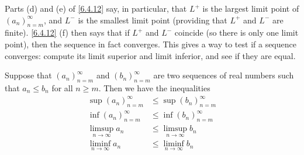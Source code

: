 \begin{note}
  Parts (d) and (e) of \cref{6.4.12} say, in particular, that \(L^+\) is the largest limit point of \((a_n)_{n = m}^\infty\), and \(L^-\) is the smallest limit point
  (providing that \(L^+\) and \(L^-\) are finite).
  \cref{6.4.12} (f) then says that if \(L^+\) and \(L^-\) coincide (so there is only one limit point), then the sequence in fact converges.
  This gives a way to test if a sequence converges: compute its limit superior and limit inferior, and see if they are equal.
\end{note}

\begin{lem}\label{6.4.13}
  Suppose that \((a_n)_{n = m}^\infty\) and \((b_n)_{n = m}^\infty\) are two sequences of real numbers such that \(a_n \leq b_n\) for all \(n \geq m\).
  Then we have the inequalities
  \begin{align*}
    \sup(a_n)_{n = m}^\infty   & \leq \sup(b_n)_{n = m}^\infty   \\
    \inf(a_n)_{n = m}^\infty   & \leq \inf(b_n)_{n = m}^\infty   \\
    \limsup_{n \to \infty} a_n & \leq \limsup_{n \to \infty} b_n \\
    \liminf_{n \to \infty} a_n & \leq \liminf_{n \to \infty} b_n
  \end{align*}
\end{lem}

